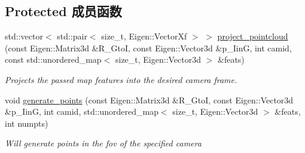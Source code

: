 \subsection*{Protected 成员函数}
\begin{DoxyCompactItemize}
\item 
std\+::vector$<$ std\+::pair$<$ size\+\_\+t, Eigen\+::\+Vector\+Xf $>$ $>$ \hyperlink{classov__init_1_1SimulatorInit_a97c74693a9fe77d025d53983c9a147ce}{project\+\_\+pointcloud} (const Eigen\+::\+Matrix3d \&R\+\_\+\+GtoI, const Eigen\+::\+Vector3d \&p\+\_\+\+IinG, int camid, const std\+::unordered\+\_\+map$<$ size\+\_\+t, Eigen\+::\+Vector3d $>$ \&feats)
\begin{DoxyCompactList}\small\item\em Projects the passed map features into the desired camera frame. \end{DoxyCompactList}\item 
void \hyperlink{classov__init_1_1SimulatorInit_a352ee444f38cb6689e37ac83e30c7a68}{generate\+\_\+points} (const Eigen\+::\+Matrix3d \&R\+\_\+\+GtoI, const Eigen\+::\+Vector3d \&p\+\_\+\+IinG, int camid, std\+::unordered\+\_\+map$<$ size\+\_\+t, Eigen\+::\+Vector3d $>$ \&feats, int numpts)
\begin{DoxyCompactList}\small\item\em Will generate points in the fov of the specified camera \end{DoxyCompactList}\end{DoxyCompactItemize}
